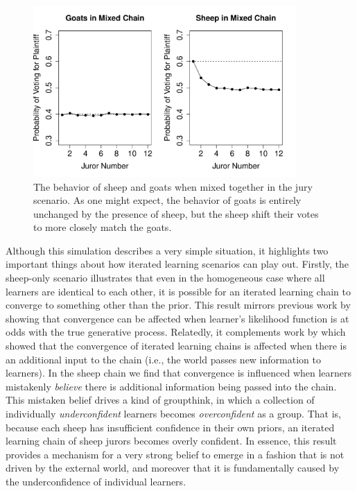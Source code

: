\documentclass[doc]{apa6}
\begin{document}
\begin{figure}[t]
\begin{center}
\includegraphics[width=10cm]{juror2.pdf} %
\caption{{\small The behavior of {\sc sheep} and {\sc goats} when mixed together in the jury scenario. As one might expect, the behavior of {\sc goats} is entirely unchanged by the presence of {\sc sheep}, but the {\sc sheep} shift their votes to more closely match the {\sc goats}.}}
\label{juror2}
\end{center}
\end{figure}

Although this simulation describes a very simple situation, it highlights two important things about how iterated learning scenarios can play out. Firstly, the {\sc sheep}-only scenario illustrates that even in the homogeneous case where all learners are identical to each other, it is possible for an iterated learning chain to converge to something other than the prior. This result mirrors previous work by \textcite{smith2009iterated} showing that convergence can be affected when learner's likelihood function is at odds with the true generative process. Relatedly, it complements work by \textcite{perforsnavarro14} which showed that the convergence of iterated learning chains is affected when there is an additional input to the chain (i.e., the world passes new information to learners). In the {\sc sheep} chain we find that convergence is influenced when learners mistakenly {\it believe} there is additional information being passed into the chain. This mistaken belief drives a kind of groupthink, in which a collection of individually {\it underconfident} learners becomes {\it overconfident} as a group. That is, because each {\sc sheep} has insufficient confidence in their own priors, an iterated learning chain of {\sc sheep} jurors becomes overly confident. In essence, this result provides a mechanism for a very strong belief to emerge in a fashion that is not driven by the external world, and moreover that it is fundamentally caused by the underconfidence of individual learners. 
\end{document}
